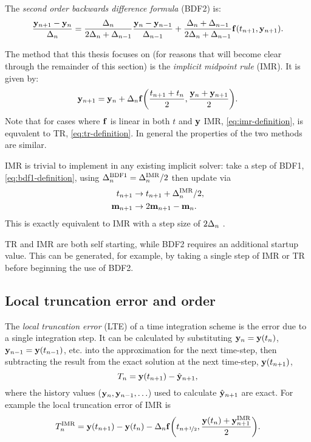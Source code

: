 The \emph{second order backwards difference formula} (BDF2) is:
\begin{equation}
  \frac{\mathbf{y}_{n+1} - \mathbf{y}_n}{\Delta_{n}} = \frac{\Delta_{n}}{2\Delta_{n} + \Delta_{n-1}} \frac{\mathbf{y}_n - \mathbf{y}_{n-1}}{\Delta_{n-1}} 
  + \frac{\Delta_{n} + \Delta_{n-1}}{2\Delta_{n} + \Delta_{n-1}} {\mathbf{f}}(t_{n+1}, \mathbf{y}_{n+1}).
\end{equation}

The method that this thesis focuses on (for reasons that will become clear through the remainder of this section) is the \emph{implicit midpoint rule} (IMR).
It is given by:
\begin{equation}
  \label{eq:imr-definition}
  \mathbf{y}_{n+1} = \mathbf{y}_n + \Delta_{n} {\mathbf{f}{\left( \frac{t_{n+1} + t_n}{2}, \frac{\mathbf{y}_n + \mathbf{y}_{n+1}}{2} \right)}}.
\end{equation}
Note that for cases where ${\mathbf{f}}$ is linear in both $t$ and $\mathbf{y}$ IMR, \cref{eq:imr-definition}, is equvalent to TR, \cref{eq:tr-definition}.
In general the properties of the two methods are similar.

IMR is trivial to implement in any existing implicit solver: take a step of BDF1, \cref{eq:bdf1-definition}, using $\Delta_{n}^{\text{BDF1}} = \Delta_{n}^{\text{IMR}}/2$ then update via
\begin{equation}
  \begin{aligned}
    t_{n+1} &\rightarrow t_{n+1} + \Delta_{n}^{\text{IMR}}/2, \\
    \mathbf{m}_{n+1} &\rightarrow 2\mathbf{m}_{n+1} - \mathbf{m}_n.
  \end{aligned}
\end{equation}
This is exactly equivalent to IMR with a step size of $2\Delta_{n}$ \cite{Malidi2005}.

TR and IMR are both self starting, while BDF2 requires an additional startup value.
This can be generated, for example, by taking a single step of IMR or TR before beginning the use of BDF2.


\subsection{Local truncation error and order}
\label{sec:deriv-local-trunc}

The \emph{local truncation error} (LTE) of a time integration scheme is the error due to a single integration step.
It can be calculated by substituting $\mathbf{y}_n = \mathbf{y}(t_n)$, $\mathbf{y}_{n-1} = \mathbf{y}(t_{n-1})$, etc. into the approximation for the next time-step, then subtracting the result from the exact solution at the next time-step, $\mathbf{y}(t_{n+1})$, \ie
\begin{equation}
  \label{eq:60}
  T_n = \mathbf{y}(t_{n+1}) - \hat{\mathbf{y}}_{n+1},
\end{equation}
where the history values ($\mathbf{y}_{n}, \mathbf{y}_{n-1}, \ldots$) used to calculate $\hat{\mathbf{y}}_{n+1}$ are exact.
For example the local truncation error of IMR is
\begin{equation}
  T_n^{\text{IMR}} =  \mathbf{y}(t_{n+1}) - \mathbf{y}(t_n) - \Delta_{n} {\mathbf{f}{\left( t_{n+\nicefrac{1}{2}}, \frac{\mathbf{y}(t_n) + \mathbf{y}_{n+1}^{\text{IMR}}}{2} \right)}}.
  \label{eq:trunc-start}
\end{equation}

